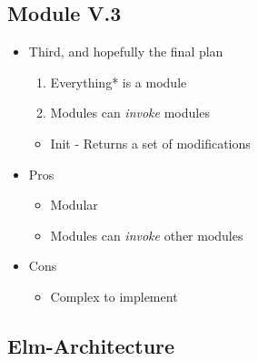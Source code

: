 




\subsection{Module V.3}

\begin{itemize}
  \item Third, and hopefully the final plan

    \begin{enumerate}
      \item Everything* is a module

      \item Modules can \textit{invoke} modules

    \end{enumerate}
    \begin{itemize}
      \item Init - Returns a set of modifications
    \end{itemize}

  \item Pros

    \begin{itemize}
      \item Modular

      \item Modules can \textit{invoke} other modules
    \end{itemize}

  \item Cons
    \begin{itemize}

      \item Complex to implement
    \end{itemize}
\end{itemize}













\subsection{Elm-Architecture}


